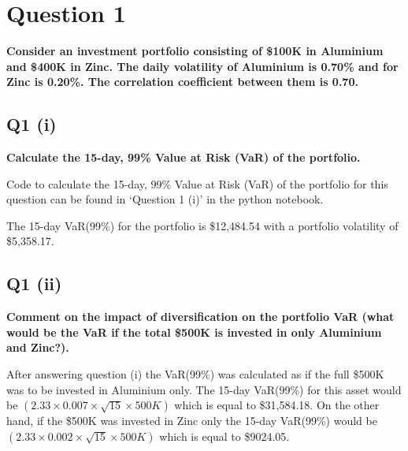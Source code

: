 \section{Question 1}\label{ssec:pt2q1}
\textbf{Consider an investment portfolio consisting of \$100K in Aluminium and \$400K in Zinc. The daily
volatility of Aluminium is 0.70\% and for Zinc is 0.20\%. The correlation coefficient between them is
0.70.}


\subsection{Q1 (i)}\label{sssec:pt2q1i}
\textbf{Calculate the 15-day, 99\% Value at Risk (VaR) of the portfolio.}

\noindent
Code to calculate the 15-day, 99\% Value at Risk (VaR) of the portfolio for this question can be found in ‘Question 1 (i)’ in the python notebook.   

\noindent
The 15-day VaR(99\%) for the portfolio is \$12,484.54 with a portfolio volatility of \$5,358.17.



\subsection{Q1 (ii)}\label{sssec:pt2q1ii}
\textbf{Comment on the impact of diversification on the portfolio VaR (what would be the VaR if the total \$500K is invested in only Aluminium and Zinc?).}

\noindent
After answering question (i) the VaR(99\%) was calculated as if the full \$500K was to be invested in Aluminium only. The 15-day VaR(99\%) for this asset would be $(2.33 \times 0.007 \times \sqrt{15} \times 500K)$ which is equal to \$31,584.18. On the other hand, if the \$500K was invested in Zinc only the 15-day VaR(99\%) would be $(2.33 \times 0.002 \times \sqrt{15} \times 500K)$ which is equal to \$9024.05.

